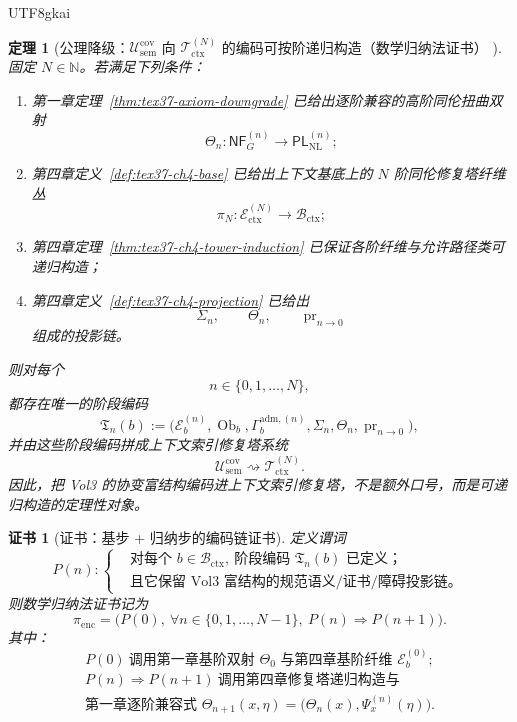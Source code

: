 \documentclass[12pt]{article}
\newtheorem{theorem}{定理}[section]
\newtheorem{Certificate}{证书}[section]
\newcommand{\NN}{\mathbb{N}}
\begin{document}
\begin{CJK*}{UTF8}{gkai}
\begin{theorem}[公理降级：$\mathcal{U}_{\mathrm{sem}}^{\mathrm{cov}}$ 向 $\mathcal{T}_{\mathrm{ctx}}^{(N)}$ 的编码可按阶递归构造（数学归纳法证书）
  ]
\label{thm:tex37-ch20-encoding}
固定 $N\in\NN$。若满足下列条件：
\begin{enumerate}
  \item 第一章定理~\ref{thm:tex37-axiom-downgrade} 已给出逐阶兼容的高阶同伦扭曲双射
  \[
    \Theta_n:\mathsf{NF}_G^{(n)}\to \mathsf{PL}_{\mathrm{NL}}^{(n)};
  \]
  \item 第四章定义~\ref{def:tex37-ch4-base} 已给出上下文基底上的 $N$ 阶同伦修复塔纤维丛
  \[
    \pi_N:\mathcal E_{\mathrm{ctx}}^{(N)}\to \mathcal B_{\mathrm{ctx}};
  \]
  \item 第四章定理~\ref{thm:tex37-ch4-tower-induction} 已保证各阶纤维与允许路径类可递归构造；
  \item 第四章定义~\ref{def:tex37-ch4-projection} 已给出
  \[
    \Sigma_n,\qquad
    \Theta_n,\qquad
    \operatorname{pr}_{n\to 0}
  \]
  组成的投影链。
\end{enumerate}
则对每个
\[
  n\in\{0,1,\dots,N\},
\]
都存在唯一的阶段编码
\[
  \mathfrak T_n(b)
  :=
  \bigl(
    \mathcal E_b^{(n)},
    \operatorname{Ob}_b,
    \Gamma_b^{\mathrm{adm},(n)},
    \Sigma_n,
    \Theta_n,
    \operatorname{pr}_{n\to 0}
  \bigr),
\]
并由这些阶段编码拼成上下文索引修复塔系统
\[
  \mathcal U_{\mathrm{sem}}^{\mathrm{cov}}
  \rightsquigarrow
  \mathcal T_{\mathrm{ctx}}^{(N)}.
\]
因此，把 Vol3 的协变富结构编码进上下文索引修复塔，不是额外口号，而是可递归构造的定理性对象。
\end{theorem}

\begin{Certificate}[证书：基步 + 归纳步的编码链证书]
\label{cert:tex37-ch20-encoding}
定义谓词
\[
  P(n):
  \left\{
  \begin{aligned}
    &\text{对每个 }b\in\mathcal B_{\mathrm{ctx}},\ \text{阶段编码 }\mathfrak T_n(b)\text{ 已定义；}\\
    &\text{且它保留 Vol3 富结构的规范语义/证书/障碍投影链。}
  \end{aligned}
  \right.
\]
则数学归纳法证书记为
\[
  \pi_{\mathrm{enc}}
  =
  \bigl(
    P(0),\
    \forall n\in\{0,1,\dots,N-1\},\ P(n)\Rightarrow P(n+1)
  \bigr).
\]
其中：
\[
  P(0)
  \ \text{调用第一章基阶双射 }\Theta_0\text{ 与第四章基阶纤维 }\mathcal E_b^{(0)};
\]
\[
  \begin{aligned}
    P(n)\Rightarrow P(n+1)
    \ \text{调用第四章修复塔递归构造与}\\
    \text{第一章逐阶兼容式 }
    \Theta_{n+1}(x,\eta)=\bigl(\Theta_n(x),\Psi_x^{(n)}(\eta)\bigr).
  \end{aligned}
\]
\end{Certificate}


\end{CJK*}
\end{document}
